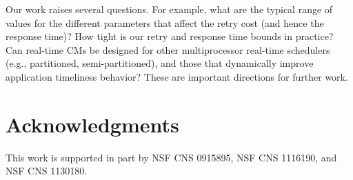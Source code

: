 \documentclass[letter]{sig-alternate}
\begin{document}
Our work raises several questions. 
For example, what are the typical range of values for the different parameters that affect the retry cost (and hence the response time)? How tight is our retry and response time bounds in practice? Can real-time CMs be designed for other multiprocessor real-time schedulers (e.g., partitioned, semi-partitioned), and those that dynamically improve application timeliness behavior? These are important directions for further work. 

\section*{Acknowledgments}
\label{sec:ack}

This work is supported in part by NSF CNS 0915895, NSF CNS 1116190, and NSF CNS 1130180.





\end{document}
